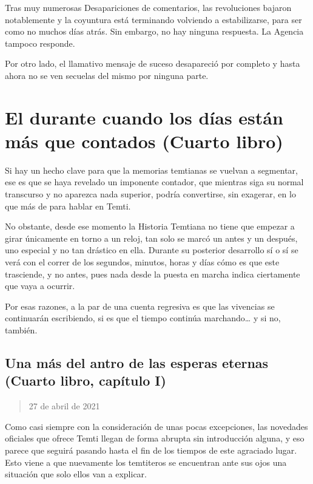 \documentclass[
]{book}
\begin{document}
Tras muy numerosas Desapariciones de comentarios, las revoluciones bajaron notablemente y la coyuntura está terminando volviendo a estabilizarse, para ser como no muchos días atrás. Sin embargo, no hay ninguna respuesta. La Agencia tampoco responde.

Por otro lado, el llamativo mensaje de suceso desapareció por completo y hasta ahora no se ven secuelas del mismo por ninguna parte.

\hypertarget{el-durante-cuando-los-duxedas-estuxe1n-muxe1s-que-contados-cuarto-libro}{%
\chapter{El durante cuando los días están más que contados (Cuarto libro)}\label{el-durante-cuando-los-duxedas-estuxe1n-muxe1s-que-contados-cuarto-libro}}

Si hay un hecho clave para que la memorias temtianas se vuelvan a segmentar, ese es que se haya revelado un imponente contador, que mientras siga su normal transcurso y no aparezca nada superior, podría convertirse, sin exagerar, en lo que más de para hablar en Temti.

No obstante, desde ese momento la Historia Temtiana no tiene que empezar a girar únicamente en torno a un reloj, tan solo se marcó un antes y un después, uno especial y no tan drástico en ella. Durante su posterior desarrollo sí o sí se verá con el correr de los segundos, minutos, horas y días cómo es que este trasciende, y no antes, pues nada desde la puesta en marcha indica ciertamente que vaya a ocurrir.

Por esas razones, a la par de una cuenta regresiva es que las vivencias se continuarán escribiendo, si es que el tiempo continúa marchando\ldots{} y si no, también.

\hypertarget{una-muxe1s-del-antro-de-las-esperas-eternas-cuarto-libro-capuxedtulo-i}{%
\section{Una más del antro de las esperas eternas (Cuarto libro, capítulo I)}\label{una-muxe1s-del-antro-de-las-esperas-eternas-cuarto-libro-capuxedtulo-i}}

\begin{quote}
27 de abril de 2021
\end{quote}

Como casi siempre con la consideración de unas pocas excepciones, las novedades oficiales que ofrece Temti llegan de forma abrupta sin introducción alguna, y eso parece que seguirá pasando hasta el fin de los tiempos de este agraciado lugar. Esto viene a que nuevamente los temtiteros se encuentran ante sus ojos una situación que solo ellos van a explicar.
\end{document}
